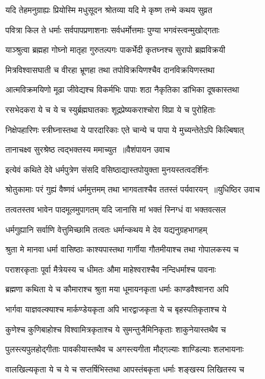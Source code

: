 \twolineshloka
{यदि तेहमनुग्राह्यः प्रियोस्मि मधुसूदन}
{श्रोतव्या यदि मे कृष्ण तन्मे कथय सुव्रत}


\twolineshloka
{पवित्रा किल ते धर्माः सर्वपापप्रणाशनाः}
{सर्वधर्मोत्तमाः पुण्या भगवंस्त्वन्मुखोद्गताः}


\twolineshloka
{याञ्श्रुत्वा ब्रह्महा गोघ्नो मातृहा गुरुतल्पगः}
{पाकर्भेदी कृतघ्नश्च सुरापो ब्रह्मविक्रयी}


\twolineshloka
{मित्रविश्वासघाती च वीरहा भ्रूणहा तथा}
{तपोविक्रयिणश्चैव दानविक्रयिणस्तथा}


\twolineshloka
{आत्मविक्रमयिणो मूढा जीवेद्यश्च विकर्मभिः}
{पापाः शठा नैकृतिका डांभिका दूषकास्तथा}


\twolineshloka
{रसभेदकरा ये च ये च स्युर्ब्रह्मघातकाः}
{शूद्रप्रेष्यकराश्चोरा विप्रा ये च पुरोहिताः}


\twolineshloka
{निक्षेपहारिणः स्त्रीघ्नास्तथा ये पारदारिकाः}
{एते चान्ये च पापा ये मुच्यन्तेतेऽपि किल्बिषात्}


\twolineshloka
{तानाचक्ष्व सुरश्रेष्ठ त्वद्भक्तस्य ममाच्युत ॥वैशंपायन उवाच}
{}


\twolineshloka
{इत्येवं कथिते देवे धर्मपुत्रेण संसदि}
{वसिष्ठाद्यास्तपोयुक्ता मुनयस्तत्वदर्शिनः}


\threelineshloka
{श्रोतुकामाः परं गुह्यं वैष्णवं धर्ममुत्तमम्}
{तथा भागवताश्चैव ततस्तं पर्यवारयन् ॥युधिष्ठिर उवाच}
{}


\twolineshloka
{तत्वतस्तव भावेन पादमूलमुपागतम्}
{यदि जानासि मां भक्तं स्निग्धं वा भक्तवत्सल}


\twolineshloka
{धर्मगुह्यानि सर्वाणि वेत्तुमिच्छामि तत्वतः}
{धर्मान्कथय मे देव यद्यनुग्रहभागहम्}


\twolineshloka
{श्रुता मे मानवा धर्मा वासिष्ठाः काश्यपास्तथा}
{गार्गीया गौतमीयाश्च तथा गोपालकस्य च}


\twolineshloka
{पराशरकृताः पूर्वा मैत्रेयस्य च धीमतः}
{औमा माहेश्वराश्चैव नन्दिधर्माश्च पावनाः}


\twolineshloka
{ब्रह्मणा कथिता ये च कौमाराश्च श्रुता मया}
{धूमायनकृता धर्माः काण्डवैश्वानरा अपि}


\twolineshloka
{भार्गवा याज्ञवल्क्याश्च मार्कण्डेयकृता अपि}
{भारद्वाजकृता ये च बृहस्पतिकृताश्च ये}


\twolineshloka
{कुणेश्च कुणिबाहोश्च विश्वामित्रकृताश्च ये}
{सुमन्तुजैमिनिकृताः शाकुनेयास्तथैव च}


\twolineshloka
{पुलस्त्यपुलहोद्गीताः पावकीयास्तथैव च}
{अगस्त्यगीता मौद्गल्याः शाण्डिल्याः शलभायनाः}


\twolineshloka
{वालखिल्यकृता ये च ये च सप्तर्षिभिस्तथा}
{आपस्तंबकृता धर्माः शङ्खस्य लिखितस्य च}


